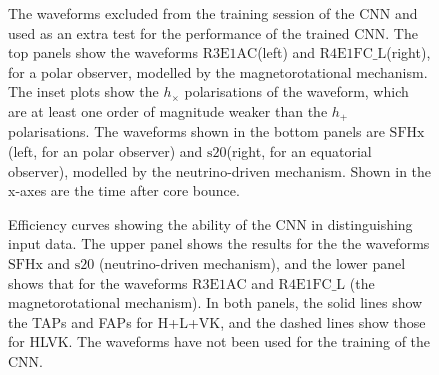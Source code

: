 \documentclass[aps,twocolumn,showpacs,groupedaddress, nofootinbib]{revtex4}  %
\begin{document}
\begin{figure}
\begin{center}
{        }
    \end{center}
    \caption{The waveforms excluded from the training session of the \ac{CNN}
and used as an extra test for the performance of the trained \ac{CNN}. The top 
panels show the waveforms $\text{R3E1AC}$(left) and $\text{R4E1FC\_L}$(right), 
for a polar observer, modelled by the magnetorotational mechanism. 
The inset plots show the $h_{\times}$ polarisations of the waveform, which are at least one order of magnitude weaker than the 
$h_{+}$ polarisations.
The waveforms shown in the bottom panels are $\text{SFHx}$(left, for an polar observer) and $\text{s}20$(right, for an equatorial observer),
modelled by the neutrino-driven mechanism. 
Shown in the x-axes are the time after core bounce.\label{fig:Extratestwaveform}} 
\end{figure}
%
% 
%
\begin{figure}
     \begin{center}
        \quad
    \end{center}
    \caption{Efficiency curves showing the ability of the \ac{CNN} in
distinguishing input data.  The upper panel shows the results for the the
waveforms $\text{SFHx}$ and $\text{s}20$ (neutrino-driven mechanism), and the
lower panel shows that for the waveforms $\text{R3E1AC}$ and $\text{R4E1FC\_L}$
(the magnetorotational mechanism).  In both panels, the solid lines show the
\acp{TAP} and \acp{FAP} for H+L+VK, and the dashed lines show those for HLVK.
The waveforms have not been used for the training of the \ac{CNN}.
\label{fig:Extratest}}
\end{figure}
\end{document}
